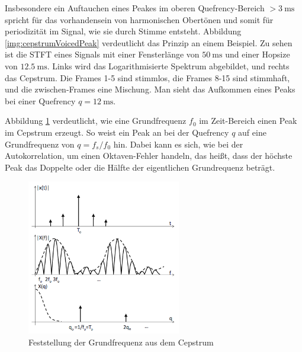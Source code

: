 Insbesondere ein Auftauchen eines Peakes im oberen Quefrency-Bereich $> \SI{3}{\milli\second}$ spricht für das vorhandensein von harmonischen Obertönen und somit für periodizität im Signal, wie sie durch Stimme entsteht. Abbildung \ref{img:cepstrumVoicedPeak} verdeutlicht das Prinzip an einem Beispiel. Zu sehen ist die STFT eines Signals mit einer Fensterlänge von $\SI{50}{\milli\second}$ und einer Hopsize von $\SI{12.5}{\milli\second}$. Links wird das Logarithmisierte Spektrum abgebildet, und rechts das Cepstrum. Die Frames 1-5 sind stimmlos, die Frames 8-15 sind stimmhaft, und die zwischen-Frames eine Mischung. Man sieht das Aufkommen eines Peaks bei einer Quefrency $q = \SI{12}{\milli\second}$.\cite[S. 16]{ricardo_ceps}

Abbildung \ref{img:cepstrumPitch} verdeutlicht, wie eine Grundfrequenz $f_0$ im Zeit-Bereich einen Peak im Cepstrum erzeugt. So weist ein Peak an bei der Quefrency $q$ auf eine Grundfrequenz von  $q = f_s/f_0$ hin. Dabei kann es sich, wie bei der Autokorrelation, um einen Oktaven-Fehler handeln, das heißt, dass der höchste Peak das Doppelte oder die Hälfte der eigentlichen Grundrequenz beträgt. \cite{cepstrumPitchTranslation}

\begin{figure}[h]
	\centering
	\includegraphics[width=0.6\textwidth]{bilder/cepstrumPitch.png}
	\caption{Feststellung der Grundfrequenz aus dem Cepstrum\cite{cepstrumPitchTranslation}}
	\label{img:cepstrumPitch}
\end{figure}	
